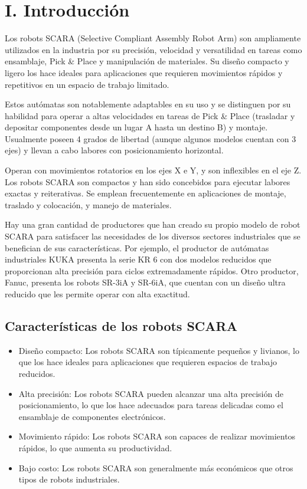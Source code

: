 \documentclass[final]{foresj}
\begin{document}
\maketitle

\section{I. Introducción}

Los robots SCARA (Selective Compliant Assembly Robot Arm) son ampliamente utilizados en la industria por su precisión, velocidad y versatilidad en tareas como ensamblaje, Pick \& Place y manipulación de materiales. Su diseño compacto y ligero los hace ideales para aplicaciones que requieren movimientos rápidos y repetitivos en un espacio de trabajo limitado.

Estos autómatas son notablemente adaptables en su uso y se distinguen por su habilidad para operar a altas velocidades en tareas de Pick \& Place (trasladar y depositar componentes desde un lugar A hasta un destino B) y montaje. Usualmente poseen 4 grados de libertad (aunque algunos modelos cuentan con 3 ejes) y llevan a cabo labores con posicionamiento horizontal.

Operan con movimientos rotatorios en los ejes X e Y, y son inflexibles en el eje Z. Los robots SCARA son compactos y han sido concebidos para ejecutar labores exactas y reiterativas. Se emplean frecuentemente en aplicaciones de montaje, traslado y colocación, y manejo de materiales.

Hay una gran cantidad de productores que han creado su propio modelo de robot SCARA para satisfacer las necesidades de los diversos sectores industriales que se benefician de sus características. Por ejemplo, el productor de autómatas industriales KUKA presenta la serie KR 6 con dos modelos reducidos que proporcionan alta precisión para ciclos extremadamente rápidos. Otro productor, Fanuc, presenta los robots SR-3iA y SR-6iA, que cuentan con un diseño ultra reducido que les permite operar con alta exactitud.

\subsection{Características de los robots SCARA}

\begin{itemize}
\item Diseño compacto: Los robots SCARA son típicamente pequeños y livianos, lo que los hace ideales para aplicaciones que requieren espacios de trabajo reducidos.
\item Alta precisión: Los robots SCARA pueden alcanzar una alta precisión de posicionamiento, lo que los hace adecuados para tareas delicadas como el ensamblaje de componentes electrónicos.
\item Movimiento rápido: Los robots SCARA son capaces de realizar movimientos rápidos, lo que aumenta su productividad.
\item Bajo costo: Los robots SCARA son generalmente más económicos que otros tipos de robots industriales.
\end{itemize}
\end{document}
